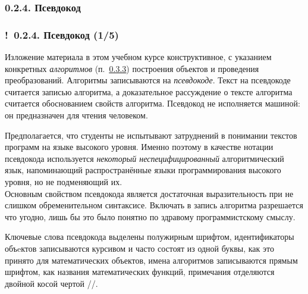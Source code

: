 \documentclass[mathserif,12pt,aspectratio=169]{beamer}
\def\emразделенной{\em разделенной}
\renewcommand{\index}[1]{}
\def\em#1{\it\color{blue}#1}
\def\odmkey#1#2{{\it\color{red} #1}\index{#2}}
\def\DMref#1#2{{\color{blue}\underline{\hyperlink{#2}{#1}}}}
\def\Ok{{\color{green}\textbf{!}\ }}
\begin{document}
\subsubsection{0.2.4. Псевдокод}\label{0.2.4.}
\begin{frame}
\frametitle{\Ok 0.2.4. Псевдокод (1/5)}

Изложение материала в этом учебном курсе конструктивное, 
с указанием конкретных {\em алгоритмов} (п.~\DMref{0.3.3}{0.3.3})
  построения объектов и проведения преобразований.
Алгоритмы записываются на \odmkey{псевдокоде}{Псевдокод}. 
Текст на псевдокоде считается записью алгоритма, 
а доказательное рассуждение о тексте алгоритма считается
обоснованием свойств алгоритма. Псевдокод не исполняется машиной: он
предназначен для чтения человеком.

\smallskip
Предполагается, что студенты не испытывают затруднений в понимании
текстов программ на языке высокого уровня. Именно поэтому в
качестве нотации псевдокода используется 
{\em некоторый неспецифицированный\/} алгоритмический язык,
напоминающий распространённые языки программирования высокого уровня,
но не подменяющий их.\\
Основным свойством псевдокода является достаточная выразительность
при не слишком обременительном синтаксисе. 
Включать в запись алгоритма разрешается что угодно,
лишь бы это было понятно по здравому программистскому смыслу.  

\smallskip
Ключевые слова псевдокода выделены полужирным шрифтом, идентификаторы
объeктов записываются курсивом и часто состоят из одной буквы, 
как это принято для математических
объектов, имена алгоритмов записываются прямым шрифтом, 
как названия математических функций,
примечания отделяются двойной косой чертой //.

\end{frame}
\end{document}
